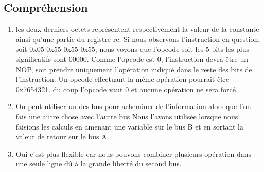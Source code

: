 \documentclass{article}
\begin{document}
\subsection*{Compr\'ehension}
\begin{enumerate}[label = (\alph*)]
	\item les deux derniers octets repr\'esentent respectivement la valeur de la constante
            ainsi qu'une partie du registre rc. Si nous observons l'instruction en question, soit
            0x05 0x55 0x55 0x55, nous voyons que l'opcode soit les 5 bits les plus significatifs sont 00000. 
             Comme l'opcode est 0, l'instruction devra être un NOP, soit prendre uniquement l'opération indiqué 
             dans le reste des bits de l'instruction. Un opcode effectuant la même opération pourrait être 0x7654321.
             du coup l'opcode vaut 0 et aucune opération ne sera forcé.
	
	\item On peut utiliser un des bus pour acheminer de l'information
	      alors que l'on fais une autre chose avec l'autre bus
	      Nous l'avons utilis\'ee lorsque nous faisions les calculs en amenant une variable
	      sur le bus B et en sortant la valeur de retour sur le bus A.
	\item Oui c'est plus flexible car nous pouvons combiner plusieurs
	      op\'eration dans une seule ligne d\^u \`a la grande libert\'e du second bus.
\end{enumerate}
\end{document}

